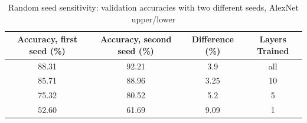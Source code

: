 \documentclass{article}
\begin{document}
\begin{table}[ht]
    \centering
        \begin{tabular}{|c|c|c|c|}
            \hline
            \textbf{Accuracy, first seed (\%)} & \textbf{Accuracy, second seed (\%)} & \textbf{Difference (\%)} & \textbf{Layers Trained} \\ \hline
            88.31 & 92.21 & 3.9  & all \\\hline
            85.71 & 88.96 & 3.25 & 10  \\\hline
            75.32 & 80.52 & 5.2  & 5   \\\hline
            52.60 & 61.69 & 9.09 & 1   \\\hline
        \end{tabular}
    \caption{Random seed sensitivity: validation accuracies with two different seeds, AlexNet upper/lower}
    \label{tab:model_accuracy}
\end{table}
\end{document}
